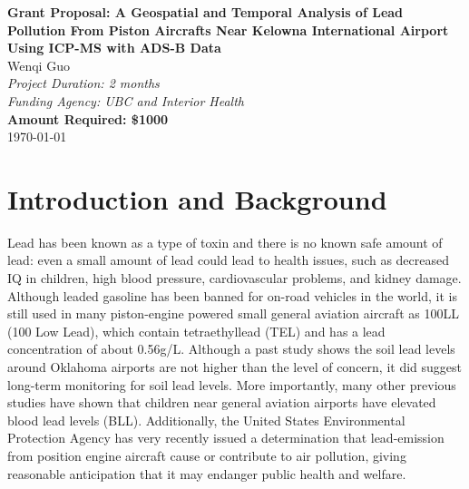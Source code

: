 \documentclass[12pt]{article}
\begin{document}
\begin{center}
    \Large{\textbf{Grant Proposal: A Geospatial and Temporal Analysis of Lead Pollution From Piston Aircrafts Near Kelowna International Airport Using ICP-MS with ADS-B Data}}\\
    \vspace{1cm}
    \large{Wenqi Guo}\\
    \vspace{0.5cm}
    \textit{Project Duration: 2 months}\\
    \vspace{0.5cm}
    \textit{Funding Agency: UBC and Interior Health}\\
    \vspace{0.5cm}
    \textbf{Amount Required: \$1000}\\
    \vspace{1cm}
    \vspace{1cm}
    \today
\end{center}
\newpage

\section{Introduction and Background}
Lead has been known as a type of toxin and there is no known safe amount of lead: even a small amount of lead could lead to health issues, such as decreased IQ in children, high blood pressure, cardiovascular problems, and kidney damage. \cite{world_health_organization_lead_2023} Although leaded gasoline has been banned for on-road vehicles in the world, it is still used in many piston-engine powered small general aviation aircraft as 100LL (100 Low Lead), which contain tetraethyllead (TEL) and has a lead concentration of about 0.56g/L. 
\cite{noauthor_safety_2021} Although a past study shows the soil lead levels around Oklahoma airports are not higher than the level of concern, it did suggest long-term monitoring for soil lead levels. \cite{mccumber_geospatial_2017} More importantly, many other previous studies have shown that children near general aviation airports have elevated blood lead levels (BLL). \cite{miranda_geospatial_2011} \cite{zahran_leaded_2023} \cite{mills_lead_2022} \cite{zahran_effect_2017} Additionally, the United States Environmental Protection Agency has very recently issued a determination that lead-emission from position engine aircraft cause or contribute to air pollution, giving reasonable anticipation that it may endanger public health and welfare. \cite{us_epa_epa_2023}
\end{document}
